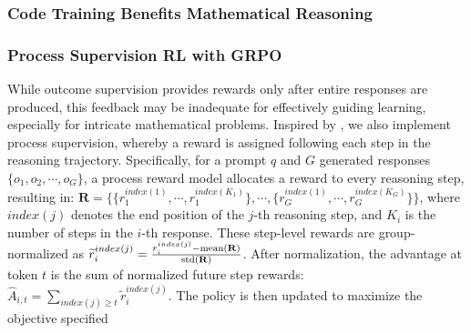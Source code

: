\subsubsection{Code Training Benefits Mathematical Reasoning}

\subsubsection{Process Supervision RL with GRPO} While outcome supervision provides rewards only after entire responses are produced, this feedback may be inadequate for effectively guiding learning, especially for intricate mathematical problems. Inspired by \cite{wang2023math}, we also implement process supervision, whereby a reward is assigned following each step in the reasoning trajectory. Specifically, for a prompt $q$ and $G$ generated responses $\{o_1, o_2, \cdots, o_G\}$, a process reward model allocates a reward to every reasoning step, resulting in: $\mathbf{R} = \{ \{r_1^{index(1)},\cdots,r_1^{index(K_1)}\}, \cdots,  \{r_G^{index(1)},\cdots,r_G^{index(K_G)}\} \}$, where $index(j)$ denotes the end position of the $j$-th reasoning step, and $K_i$ is the number of steps in the $i$-th response. These step-level rewards are group-normalized as $\widetilde{r}_i^{index(j)} = \frac{r_i^{index(j)} - {\rm mean(\mathbf{R})}}{{\rm std(\mathbf{R})}}$.
After normalization, the advantage at token $t$ is the sum of normalized future step rewards: $\hat{A}_{i, t} = \sum_{index(j) \ge t} \widetilde{r}_i^{index(j)}$.
The policy is then updated to maximize the objective specified

